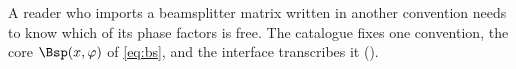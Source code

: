 
A reader who imports a beamsplitter matrix written in another convention needs
to know which of its phase factors is free. The catalogue fixes one
convention, the core $\Bsp(x,\varphi)$ of \eqref{eq:bs}, and the interface
transcribes it ().

